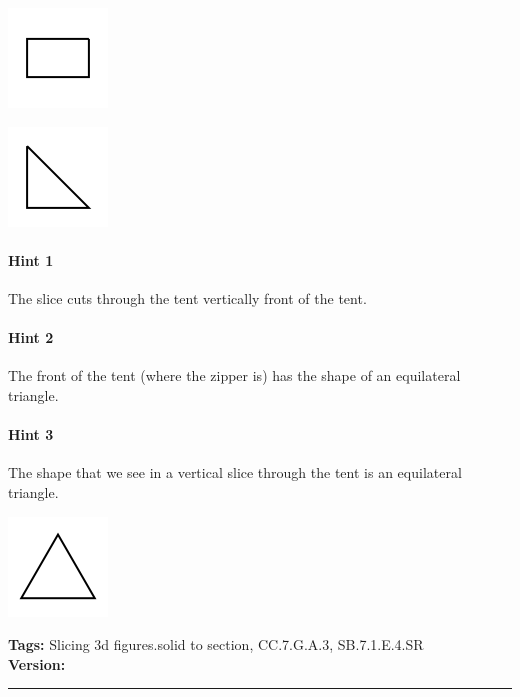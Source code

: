 \documentclass[twocolumn,10pt]{article}
\def\shrinkfactor{0.4}
\begin{document}
\includegraphics[scale=\shrinkfactor]{figures/0e5042b475e0847d67b74c0482f8e8173f798656.png}


\includegraphics[scale=\shrinkfactor]{figures/02361468f7d85874956214c7a0a119b84a8c2651.png}



\paragraph{Hint 1}The slice cuts through the tent vertically \DIFdelbegin {}\DIFdelend \DIFaddbegin {}\DIFaddend front of the tent.

\paragraph{Hint 2}The front of the tent (where the zipper is) has the shape of an equilateral triangle.

\paragraph{Hint 3}The shape that we see in a vertical slice through the tent is an equilateral triangle.   

\includegraphics[scale=\shrinkfactor]{figures/15c855a8a232e6c1873c5f46769050a9c13051b8.png}



\medskip
\noindent
\textbf{Tags:} {\footnotesize Slicing 3d figures.solid to section, CC.7.G.A.3, SB.7.1.E.4.SR}\\
\textbf{Version:} \DIFdelbegin {}\DIFdelend \DIFaddbegin {}\DIFaddend \smallskip\hrule
\end{document}
